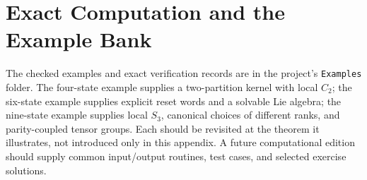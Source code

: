 \chapter{Exact Computation and the Example Bank}
The checked examples and exact verification records are in the project's
\texttt{Examples} folder. The four-state example supplies a two-partition
kernel with local $C_2$; the six-state example supplies explicit reset
words and a solvable Lie algebra; the nine-state example supplies local
$S_3$, canonical choices of different ranks, and parity-coupled tensor groups.
Each should be revisited at the theorem it illustrates, not introduced
only in this appendix. A future computational edition should supply common
input/output routines, test cases, and selected exercise solutions.


